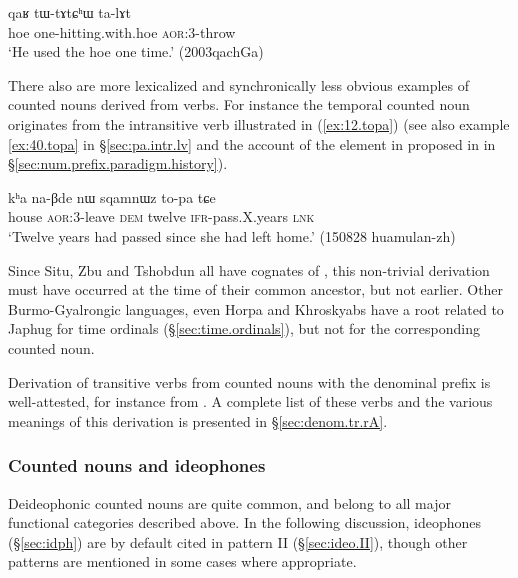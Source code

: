 \begin{exe}
\ex \label{ex:tWtAtChW}
\gll qaʁ tɯ-tɤtɕʰɯ ta-lɤt  \\
hoe one-hitting.with.hoe \textsc{aor}:3\flobv{}-throw \\
\glt `He used the hoe one time.' (2003qachGa)
\end{exe}

There also are more lexicalized and synchronically less obvious examples of counted nouns derived from verbs. For instance the temporal counted noun  originates from the intransitive verb   illustrated in (\ref{ex:12.topa}) (see also example \ref{ex:40.topa}  in §\ref{sec:pa.intr.lv} and the account of the  element in  proposed in in §\ref{sec:num.prefix.paradigm.history}). 

\begin{exe}
\ex \label{ex:12.topa} 
\gll kʰa na-βde nɯ sqamnɯz to-pa tɕe \\ 
house \textsc{aor}:3\flobv{}-leave \textsc{dem} twelve  \textsc{ifr}-pass.X.years \textsc{lnk} \\
\glt `Twelve years had passed since she had left home.' (150828 huamulan-zh)
\end{exe}

Since Situ, Zbu and Tshobdun all have cognates of , this non-trivial derivation must have occurred at the time of their common ancestor, but not earlier. Other Burmo-Gyalrongic languages, even Horpa and Khroskyabs \citep{jacques17stau} have a root related to Japhug  for time ordinals (§\ref{sec:time.ordinals}), but not for the corresponding counted noun. 
  
Derivation of transitive verbs from counted nouns with the denominal prefix  is well-attested, for instance  from . A complete list of these verbs and the various meanings of this derivation is presented in  §\ref{sec:denom.tr.rA}.
 
\subsubsection{Counted nouns and ideophones}   \label{sec:CN.ideophones}
Deideophonic counted nouns are quite common, and belong to all major functional categories described above. In the following discussion, ideophones (§\ref{sec:idph}) are by default cited in pattern II (§\ref{sec:ideo.II}), though other patterns are mentioned in some cases where appropriate.

